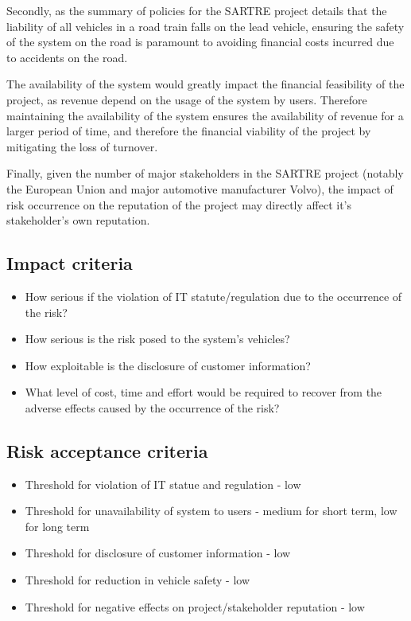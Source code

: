 \documentclass[british,11pt,a4paper]{article}
\begin{document}
Secondly, as the summary of policies for the SARTRE project \cite{Davila2013-cy} details that the liability of all vehicles in a road train falls on the lead vehicle, ensuring the safety of the system on the road is paramount to avoiding financial costs incurred due to accidents on the road. 

The availability of the system would greatly impact the financial feasibility of the project, as revenue depend on the usage of the system by users. Therefore maintaining the availability of the system ensures the availability of revenue for a larger period of time, and therefore the financial viability of the project by mitigating the loss of turnover.

Finally, given the number of major stakeholders in the SARTRE project (notably the European Union and major automotive manufacturer Volvo), the impact of risk occurrence on the reputation of the project may directly affect it's stakeholder's own reputation.

\subsection{Impact criteria}
\begin{itemize}
	\setlength\itemsep{-0.3em}
	\item How serious if the violation of IT statute/regulation due to the occurrence of the risk?
	\item How serious is the risk posed to the system's vehicles?
	\item How exploitable is the disclosure of customer information?
	\item What level of cost, time and effort would be required to recover from the adverse effects caused by the occurrence of the risk?
\end{itemize}

\subsection{Risk acceptance criteria}
\begin{itemize}
	\setlength\itemsep{-0.3em}
	\item Threshold for violation of IT statue and regulation - low
	\item Threshold for unavailability of system to users - medium for short term, low for long term
	\item Threshold for disclosure of customer information - low
	\item Threshold for reduction in vehicle safety - low
	\item Threshold for negative effects on project/stakeholder reputation - low
\end{itemize}
\end{document}
